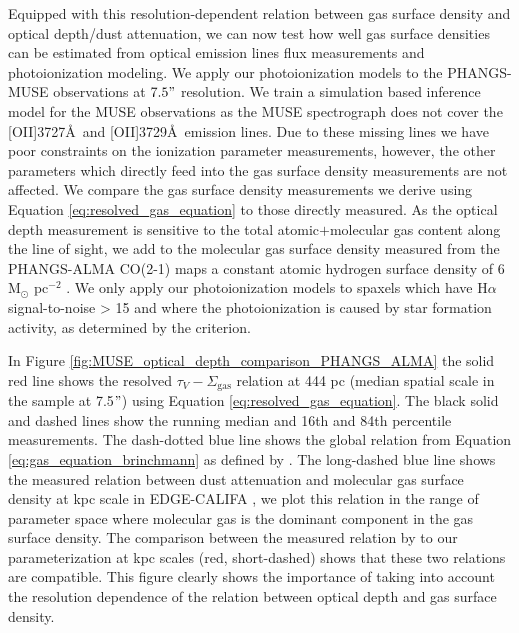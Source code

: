 \documentclass[fleqn,usenatbib]{mnras}
\begin{document}
Equipped with this resolution-dependent relation between gas surface density and optical depth/dust attenuation, we can now test how well gas surface densities can be estimated from optical emission lines flux measurements and photoionization modeling. We apply our photoionization models to the PHANGS-MUSE observations at $7.5"$ resolution. We train a simulation based inference model for the MUSE observations as the MUSE spectrograph does not cover the [OII]3727\AA\ and [OII]3729\AA\ emission lines. Due to these missing lines we have poor constraints on the ionization parameter measurements, however, the other parameters which directly feed into the gas surface density measurements are not affected. We compare the gas surface density measurements we derive using Equation \ref{eq:resolved_gas_equation} to those directly measured. As the optical depth measurement is sensitive to the total atomic$+$molecular gas content along the line of sight, we add to the molecular gas surface density measured from the PHANGS-ALMA CO(2-1) maps \citep{leroy2021} a constant atomic hydrogen surface density of 6 M$_{\odot}$ pc$^{-2}$ \citep{barrera-ballesteros2020}. We only apply our photoionization models to spaxels which have H$\alpha$ signal-to-noise > 15 and where the photoionization is caused by star formation activity, as determined by the \cite{kauffmann2003} criterion. 

In Figure \ref{fig:MUSE_optical_depth_comparison_PHANGS_ALMA} the solid red line shows the resolved $\tau_V-\Sigma_{\textrm{gas}}$ relation at 444 pc (median spatial scale in the sample at 7.5$"$) using Equation \ref{eq:resolved_gas_equation}. The black solid and dashed lines show the running median and 16th and 84th percentile measurements. The dash-dotted blue line shows the global relation from Equation \ref{eq:gas_equation_brinchmann} as defined by \cite{brinchmann2013}. The long-dashed blue line shows the measured relation between dust attenuation and molecular gas surface density at kpc scale in EDGE-CALIFA \citep[][]{barrera-ballesteros2021}, we plot this relation in the range of parameter space where molecular gas is the dominant component in the gas surface density. The comparison between the measured relation by \cite{barrera-ballesteros2021} to our parameterization at kpc scales (red, short-dashed) shows that these two relations are compatible. This figure clearly shows the importance of taking into account the resolution dependence of the relation between optical depth and gas surface density. 
\end{document}
